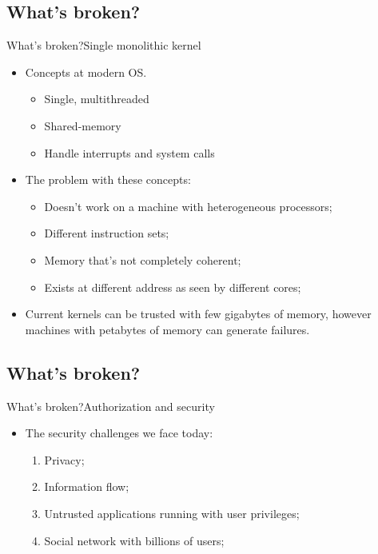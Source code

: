 \documentclass[10pt]{beamer}
\begin{document}
\subsection{What's broken?}
\begin{frame}{What's broken?}{Single monolithic kernel}
  \begin{itemize}
    \item Concepts at modern OS.
      \begin{itemize}
        \item Single, multithreaded
        \item Shared-memory
        \item Handle interrupts and system calls
      \end{itemize}
    \item The problem with these concepts:
      \begin{itemize}
        \item Doesn't work on a machine with heterogeneous processors;
        \item Different instruction sets;
        \item Memory that's not completely coherent;
        \item Exists at different address as seen by different cores;
      \end{itemize}
    \item Current kernels can be trusted with few gigabytes of memory, however
          machines with petabytes of memory can generate failures.
  \end{itemize}
\end{frame}

\subsection{What's broken?}
\begin{frame}{What's broken?}{Authorization and security}
  \begin{itemize}
    \item The security challenges we face today:
    \begin{enumerate}
      \item Privacy;
      \item Information flow;
      \item Untrusted applications running with user privileges;
      \item Social network with billions of users;
    \end{enumerate}
  \end{itemize}
\end{frame}
\end{document}
